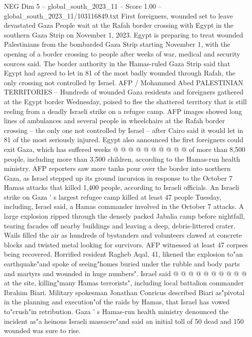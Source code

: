 \begin{textsample}{NEG Dim 5 – global\_south\_2023\_11 – Score 1.00 – global\_south\_2023\_11/103116849.txt}  \label{ex:f5_neg_177}
First foreigners, wounded set to leave devastated Gaza People wait at the Rafah border crossing with Egypt in the southern Gaza Strip on November 1, 2023.
Egypt is preparing to treat wounded Palestinians from the bombarded Gaza Strip starting November 1, with the opening of a border crossing to people after weeks of war, medical and security sources said.
The border authority in the Hamas-ruled Gaza Strip said that Egypt had agreed to let in 81 of the most badly wounded through Rafah, the only crossing not controlled by Israel.
AFP / Mohammed Abed PALESTINIAN TERRITORIES -- Hundreds of wounded Gaza residents and foreigners gathered at the Egypt border Wednesday, poised to flee the shattered territory that is still reeling from a deadly Israeli strike on a refugee camp.
AFP images showed long lines of ambulances and several people in wheelchairs at the Rafah border crossing -- the only one not controlled by Israel -- after Cairo said it would let in 81 of the most seriously injured.
Egypt also announced the first foreigners could exit Gaza, which has suffered weeks @ @ @ @ @ @ @ @ @ @ of more than 8,500 people, including more than 3,500 children, according to the Hamas-run health ministry.
AFP reporters saw more tanks pour over the border into northern Gaza, as Israel stepped up its ground incursion in response to the October 7 Hamas attacks that killed 1,400 people, according to Israeli officials.
An Israeli strike on Gaza ' s largest refugee camp killed at least 47 people Tuesday, including, Israel said, a Hamas commander involved in the October 7 attacks.
A large explosion ripped through the densely packed Jabalia camp before nightfall, tearing facades off nearby buildings and leaving a deep, debris-littered crater.
Wails filled the air as hundreds of bystanders and volunteers clawed at concrete blocks and twisted metal looking for survivors.
AFP witnessed at least 47 corpses being recovered.
Horrified resident Ragheb Aqal, 41, likened the explosion to"an earthquake"and spoke of seeing"homes buried under the rubble and body parts and martyrs and wounded in huge numbers".
Israel said @ @ @ @ @ @ @ @ @ @ at the site, killing"many Hamas terrorists", including local battalion commander Ibrahim Biari.
Military spokesman Jonathan Conricus described Biari as"pivotal in the planning and execution"of the raids by Hamas, that Israel has vowed to"crush"in retribution.
Gaza ' s Hamas-run health ministry denounced the incident as"a heinous Israeli massacre"and said an initial toll of 50 dead and 150 wounded was sure to rise.

\end{textsample}
